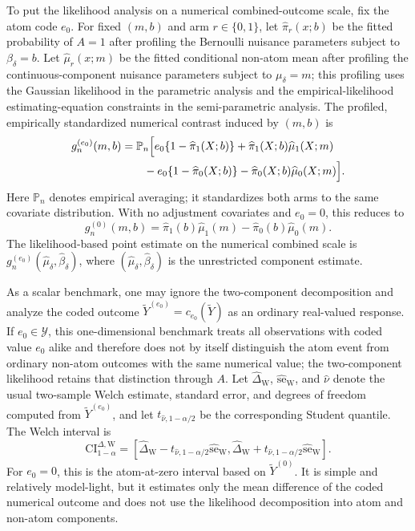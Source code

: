 \documentclass[11pt]{article}
\begin{document}
To put the likelihood analysis on a numerical combined-outcome scale, fix the atom code $e_0$. For fixed $(m,b)$ and arm $r\in\{0,1\}$, let $\widehat{\pi}_r(x;b)$ be the fitted probability of $A=1$ after profiling the Bernoulli nuisance parameters subject to $\beta_\delta=b$. Let $\widehat{\mu}_r(x;m)$ be the fitted conditional non-atom mean after profiling the continuous-component nuisance parameters subject to $\mu_\delta=m$; this profiling uses the Gaussian likelihood in the parametric analysis and the empirical-likelihood estimating-equation constraints in the semi-parametric analysis. The profiled, empirically standardized numerical contrast induced by $(m,b)$ is
\begin{align}
  g_n^{(e_0)}(m,b)
  &=
  \mathbb{P}_n
  \Bigl[
    e_0\{1-\widehat{\pi}_1(X;b)\}
    + \widehat{\pi}_1(X;b)\widehat{\mu}_1(X;m)
    \nonumber\\
  &\qquad
    - e_0\{1-\widehat{\pi}_0(X;b)\}
    - \widehat{\pi}_0(X;b)\widehat{\mu}_0(X;m)
  \Bigr].
  \label{eq:profiled-delta-map}
\end{align}
Here $\mathbb{P}_n$ denotes empirical averaging; it standardizes both arms to the same covariate distribution. With no adjustment covariates and $e_0=0$, this reduces to
\[
  g_n^{(0)}(m,b)
  =
  \widehat{\pi}_1(b)\widehat{\mu}_1(m)
  -
  \widehat{\pi}_0(b)\widehat{\mu}_0(m).
\]
The likelihood-based point estimate on the numerical combined scale is $g_n^{(e_0)}(\widehat{\mu}_\delta,\widehat{\beta}_\delta)$, where $(\widehat{\mu}_\delta,\widehat{\beta}_\delta)$ is the unrestricted component estimate.

As a scalar benchmark, one may ignore the two-component decomposition and analyze the coded outcome $\widetilde{Y}^{(e_0)}=c_{e_0}(\widetilde{Y})$ as an ordinary real-valued response. If $e_0\in\mathcal{Y}$, this one-dimensional benchmark treats all observations with coded value $e_0$ alike and therefore does not by itself distinguish the atom event from ordinary non-atom outcomes with the same numerical value; the two-component likelihood retains that distinction through $A$. Let $\widehat{\Delta}_{\mathrm{W}}$, $\widehat{\mathrm{se}}_{\mathrm{W}}$, and $\widehat{\nu}$ denote the usual two-sample Welch estimate, standard error, and degrees of freedom computed from $\widetilde{Y}^{(e_0)}$, and let $t_{\widehat{\nu},1-\alpha/2}$ be the corresponding Student quantile. The Welch interval is
\begin{equation}
  \mathrm{CI}^{\Delta,\mathrm{W}}_{1-\alpha}
  =
  \left[
    \widehat{\Delta}_{\mathrm{W}}
    -
    t_{\widehat{\nu},1-\alpha/2}\widehat{\mathrm{se}}_{\mathrm{W}},
    \widehat{\Delta}_{\mathrm{W}}
    +
    t_{\widehat{\nu},1-\alpha/2}\widehat{\mathrm{se}}_{\mathrm{W}}
  \right].
  \label{eq:welch-delta-ci}
\end{equation}
For $e_0=0$, this is the atom-at-zero interval based on $\widetilde{Y}^{(0)}$. It is simple and relatively model-light, but it estimates only the mean difference of the coded numerical outcome and does not use the likelihood decomposition into atom and non-atom components.
\end{document}
